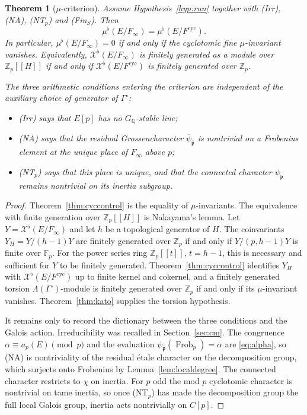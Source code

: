 \documentclass[11pt]{article}
\newtheorem{theorem}{Theorem}[section]
\theoremstyle{definition}
\theoremstyle{remark}
\newcommand{\Z}{\mathbb{Z}}
\newcommand{\Q}{\mathbb{Q}}
\newcommand{\F}{\mathbb{F}}
\newcommand{\Frob}{\operatorname{Frob}}
\newcommand{\cyc}{\mathrm{cyc}}
\newcommand{\flatp}{\flat}
\newcommand{\pp}{\mathfrak{p}}
\newcommand{\ppb}{\overline{\mathfrak{p}}}
\newcommand{\cX}{\mathcal{X}}
\newcommand{\Lam}{\Lambda}
\newcommand{\Gam}{\Gamma^{\circ}}
\begin{document}
\begin{theorem}[\(\mu\)-criterion]
\label{thm:mu}
Assume Hypothesis~\ref{hyp:run} together with \textup{(Irr)}, \textup{(NA)}, \textup{(NT\(_p\))} and \textup{(Fin\(_S\))}. Then
\begin{equation}
\label{eq:criterion}
\mu^{\flatp}(E/F_\infty)
=
\mu^{\flatp}(E/F^{\cyc}).
\end{equation}
In particular, \(\mu^{\flatp}(E/F_\infty)=0\) if and only if the cyclotomic fine \(\mu\)-invariant vanishes. Equivalently, \(\cX^{\flatp}(E/F_\infty)\) is finitely generated as a module over \(\Z_p[[H]]\) if and only if \(\cX^{\flatp}(E/F^{\cyc})\) is finitely generated over \(\Z_p\).

The three arithmetic conditions entering the criterion are independent of the auxiliary choice of generator of \(\Gam\):
\begin{itemize}
\item \textup{(Irr)} says that \(E[p]\) has no \(G_\Q\)-stable line;
\item \textup{(NA)} says that the residual Grossencharacter \(\overline{\psi}_{\ppb}\) is nontrivial on a Frobenius element at the unique place of \(F_\infty\) above \(p\);
\item \textup{(NT\(_p\))} says that this place is unique, and that the connected character \(\psi_{\pp}\) remains nontrivial on its inertia subgroup.
\end{itemize}
\end{theorem}

\begin{proof}
Theorem~\ref{thm:cyccontrol} is the equality of \(\mu\)-invariants. The equivalence with finite generation over \(\Z_p[[H]]\) is Nakayama's lemma. Let \(Y=\cX^{\flatp}(E/F_\infty)\) and let \(h\) be a topological generator of \(H\). The coinvariants \(Y_H=Y/(h-1)Y\) are finitely generated over \(\Z_p\) if and only if \(Y/(p,h-1)Y\) is finite over \(\F_p\). For the power series ring \(\Z_p[[t]]\), \(t=h-1\), this is necessary and sufficient for \(Y\) to be finitely generated. Theorem~\ref{thm:cyccontrol} identifies \(Y_H\) with \(\cX^{\flatp}(E/F^{\cyc})\) up to finite kernel and cokernel, and a finitely generated torsion \(\Lam(\Gam)\)-module is finitely generated over \(\Z_p\) if and only if its \(\mu\)-invariant vanishes. Theorem~\ref{thm:kato} supplies the torsion hypothesis.

It remains only to record the dictionary between the three conditions and the Galois action. Irreducibility was recalled in Section~\ref{sec:cm}. The congruence \(\alpha\equiv a_p(E)\pmod{p}\) and the evaluation \(\psi_{\ppb}(\Frob_p)=\alpha\) are \eqref{eq:alpha}, so (NA) is nontriviality of the residual \'etale character on the decomposition group, which surjects onto Frobenius by Lemma~\ref{lem:localdegree}. The connected character restricts to \(\chi\) on inertia. For \(p\) odd the mod \(p\) cyclotomic character is nontrivial on tame inertia, so once (NT\(_p\)) has made the decomposition group the full local Galois group, inertia acts nontrivially on \(C[p]\).
\end{proof}
\end{document}
